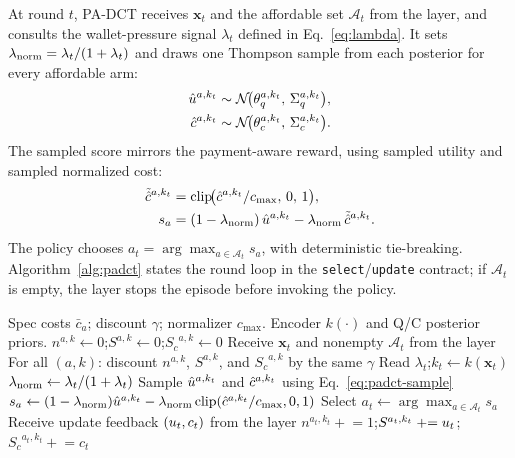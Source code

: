 At round $t$, PA-DCT receives $\mathbf{x}_t$ and the affordable set $\mathcal{A}_t$ from the layer, and consults the wallet-pressure signal $\lambda_t$ defined in Eq.~\eqref{eq:lambda}. It sets $\lambda_{\mathrm{norm}}=\lambda_t/(1+\lambda_t)$ and draws one Thompson sample from each posterior for every affordable arm:
\begin{equation}
\label{eq:padct-sample}
\begin{aligned}
\hat u^{a,k_t}
&\sim \mathcal{N}\!\big(\theta_q^{a,k_t},\, \Sigma_q^{a,k_t}\big),\\
\hat c^{a,k_t}
&\sim \mathcal{N}\!\big(\theta_c^{a,k_t},\, \Sigma_c^{a,k_t}\big).
\end{aligned}
\end{equation}
The sampled score mirrors the payment-aware reward, using sampled utility and sampled normalized cost:
\begin{equation}
\label{eq:padct-score}
\begin{aligned}
\tilde{\hat c}^{a,k_t}
&= \mathrm{clip}\!\big(\hat c^{a,k_t}/c_{\max},\,0,\,1\big),\\
s_a
&= (1-\lambda_{\mathrm{norm}})\,\hat u^{a,k_t}
  - \lambda_{\mathrm{norm}}\,\tilde{\hat c}^{a,k_t}.
\end{aligned}
\end{equation}
The policy chooses $a_t=\arg\max_{a\in\mathcal{A}_t}s_a$, with deterministic tie-breaking. Algorithm~\ref{alg:padct} states the round loop in the \texttt{select}/\texttt{update} contract; if $\mathcal{A}_t$ is empty, the layer stops the episode before invoking the policy.

\begin{algorithm}[!t]
\caption{PA-DCT policy loop.}
\label{alg:padct}
\begin{algorithmic}[1]
\Require Spec costs $\bar c_a$; discount $\gamma$; normalizer $c_{\max}$.
\Require Encoder $k(\cdot)$ and Q/C posterior priors.
  \State $n^{a,k}\leftarrow 0$;\quad $S^{a,k}\leftarrow 0$;\quad ${S_c}^{a,k}\leftarrow 0$
\EndFor
{}
  \State Receive $\mathbf{x}_t$ and nonempty $\mathcal{A}_t$ from the layer
  \State For all $(a,k)$: discount $n^{a,k}$, $S^{a,k}$, and ${S_c}^{a,k}$ by the same $\gamma$
  \State Read $\lambda_t$;\quad $k_t\leftarrow k(\mathbf{x}_t)$
  \State $\lambda_{\mathrm{norm}}\leftarrow\lambda_t/(1+\lambda_t)$
    \State Sample $\hat u^{a,k_t}$ and $\hat c^{a,k_t}$ using Eq.~\eqref{eq:padct-sample}
    \State $s_a\leftarrow(1-\lambda_{\mathrm{norm}})\hat u^{a,k_t}-\lambda_{\mathrm{norm}}\,\mathrm{clip}(\hat c^{a,k_t}/c_{\max},0,1)$
  \EndFor
  \State Select $a_t\leftarrow\arg\max_{a\in\mathcal{A}_t}s_a$
  \State Receive update feedback $(u_t,c_t)$ from the layer
  \State $n^{a_t,k_t}\mathrel{+}=1$;\quad $S^{a_t,k_t}\mathrel{+}=u_t$;\quad ${S_c}^{a_t,k_t}\mathrel{+}=c_t$
\EndFor
\end{algorithmic}
\end{algorithm}

